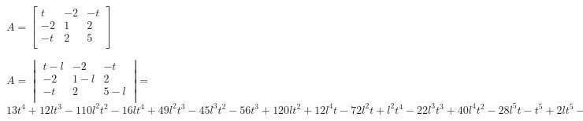 \documentclass{article}
\begin{document}
$A=\begin{bmatrix}
t &-2 &-t\\
-2 &1 &2\\
-t &2 &5\\
\end{bmatrix}
$

$A=\begin{vmatrix}
t-l &-2 &-t\\
-2 &1-l &2\\
-t &2 &5-l\\
\end{vmatrix}
$=$13t^4+12lt^3-110l^2t^2-16lt^4+49l^2t^3-45l^3t^2-56t^3+120lt^2+12l^4t-72l^2t+l^2t^4-22l^3t^3+40l^4t^2-28l^5t-t^5+2lt^5-47l^4+l^5+8l^3+7l^6+132l^3t+2l^3t^4+l^4t^3-5l^5t^2+4l^6t-l^2t^5-l^7+80t^2-160lt+80l^2$
\end{document}
